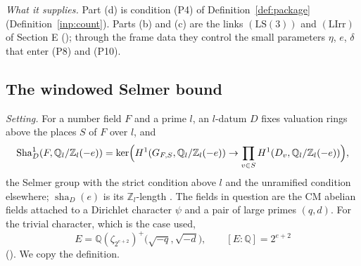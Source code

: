 \documentclass[10pt]{amsart}
\theoremstyle{definition}
\theoremstyle{remark}
\newcommand{\Z}{\mathbb Z}
\newcommand{\Q}{\mathbb Q}
\begin{document}
\emph{What it supplies.} Part (d) is condition (P4) of
Definition~\ref{def:package} (Definition~\ref{inp:count}). Parts (b) and
(c) are the links $(\mathrm{LS}(3))$ and $(\mathrm{LIrr})$ of Section E
(\cite[Proposition~\ref{A-i4:hyp-S}]{Annex}); through the frame data they
control the small parameters $\eta$, $e$, $\delta$ that enter (P8) and
(P10).

\subsection{The windowed Selmer bound}\label{inp:ssec-selmer}

\emph{Setting.} For a number field $F$ and a prime $l$, an $l$-datum $D$
fixes valuation rings above the places $S$ of $F$ over $l$, and
\[
 \mathrm{Sha}^1_D(F,\Q_l/\Z_l(-e))=\ker\Bigl(H^1(G_{F,S},\Q_l/\Z_l(-e))\to\prod_{v\in S}H^1(D_v,\Q_l/\Z_l(-e))\Bigr),
\]
the Selmer group with the strict condition above $l$ and the unramified
condition elsewhere; $\operatorname{sha}_D(e)$ is its $\Z_l$-length
\cite[Definition~\ref{A-i5:def-ldata}]{Annex}. The fields in question are
the CM abelian fields attached to a Dirichlet character $\psi$ and a pair of
large primes $(q,d)$. For the trivial character, which is the case used,
\[
 E=\Q(\zeta_{2^{e+2}})^+\bigl(\sqrt{-q},\sqrt{-d}\bigr),\qquad [E:\Q]=2^{e+2}
\]
(\cite[Remark~\ref{A-i5:rem-trivial}]{Annex}). We copy the definition.
\end{document}
